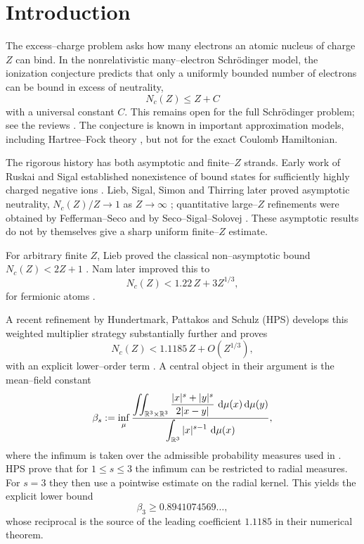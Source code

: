 \section{Introduction}

The excess--charge problem asks how many electrons an atomic nucleus of charge $Z$ can bind.  In the nonrelativistic many--electron Schr\"odinger model, the ionization conjecture predicts that only a uniformly bounded number of electrons can be bound in excess of neutrality,
\[
 N_c(Z)\le Z+C
\]
with a universal constant $C$.  This remains open for the full Schr\"odinger problem; see the reviews \cite{Nam2013Review,Nam2022Review}.  The conjecture is known in important approximation models, including Hartree--Fock theory \cite{Solovej2003}, but not for the exact Coulomb Hamiltonian.

The rigorous history has both asymptotic and finite--$Z$ strands.  Early work of Ruskai and Sigal established nonexistence of bound states for sufficiently highly charged negative ions \cite{Ruskai1982,Sigal1982}.  Lieb, Sigal, Simon and Thirring later proved asymptotic neutrality, $N_c(Z)/Z\to1$ as $Z\to\infty$ \cite{LSST1988}; quantitative large--$Z$ refinements were obtained by Fefferman--Seco and by Seco--Sigal--Solovej \cite{FeffermanSeco1990,SecoSigalSolovej1990}.  These asymptotic results do not by themselves give a sharp uniform finite--$Z$ estimate.

For arbitrary finite $Z$, Lieb proved the classical non--asymptotic bound $N_c(Z)<2Z+1$ \cite{Lieb1984}.  Nam later improved this to
\[
 N_c(Z)<1.22\,Z+3Z^{1/3},
\]
for fermionic atoms \cite{Nam2012}.

A recent refinement by Hundertmark, Pattakos and Schulz (HPS) develops this weighted multiplier strategy substantially further and proves
\[
 N_c(Z)<1.1185\,Z+O(Z^{1/3}),
\]
with an explicit lower--order term \cite{HPS2025}.  A central object in their argument is the mean--field constant
\begin{equation}\label{eq:def-beta-s}
 \beta_s:=\inf_{\mu}
 \frac{\displaystyle
 \iint_{\mathbb{R}^3\times\mathbb{R}^3}
 \frac{|x|^s+|y|^s}{2|x-y|}\,\,\mathrm{d}\mu(x)\,\mathrm{d}\mu(y)}
 {\displaystyle\int_{\mathbb{R}^3}|x|^{s-1}\,\,\mathrm{d}\mu(x)},
\end{equation}
where the infimum is taken over the admissible probability measures used in \cite{HPS2025}.  HPS prove that for $1\le s\le3$ the infimum can be restricted to radial measures.  For $s=3$ they then use a pointwise estimate on the radial kernel.  This yields the explicit lower bound
\[
 \beta_3\ge 0.8941074569\ldots,
\]
whose reciprocal is the source of the leading coefficient $1.1185$ in their numerical theorem.

